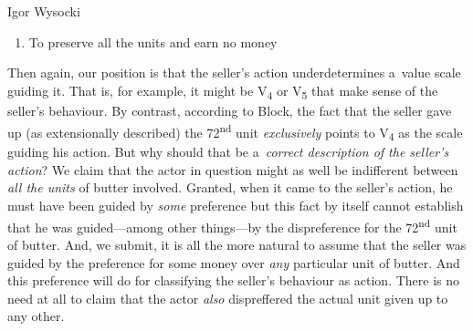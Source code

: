 \begin{artengenv}{Igor Wysocki}
\begin{enumerate}[label=(\arabic*)]
\item To preserve all the units and earn no money

\end{enumerate}







Then again, our position is that the seller's action underdetermines a~value scale guiding it. That is, for example, it might be V\textsubscript{4} or V\textsubscript{5} that make sense of the seller's behaviour. By contrast, according to Block, the fact that the seller gave up (as extensionally described) the 72\textsuperscript{nd }unit \textit{exclusively} points to V\textsubscript{4} as the scale guiding his action. But why should that be a~\textit{correct description of the seller's action}? We claim that the actor in question might as well be indifferent between \textit{all the units} of butter involved. Granted, when it came to the seller's action, he must have been guided by \textit{some} preference but this fact by itself cannot establish that he was guided---among other things---by the dispreference for the 72\textsuperscript{nd} unit of butter. And, we submit, it is all the more natural to assume that the seller was guided by the preference for some money over \textit{any} particular unit of butter. And this preference will do for classifying the seller's behaviour as action. There is no need at all to claim that the actor \textit{also} dispreffered the actual unit given up to any other.




\end{artengenv}
